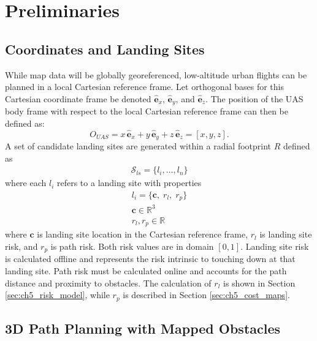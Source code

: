 \section{Preliminaries}\label{sec:ch5_preliminaries}

\subsection{Coordinates and Landing Sites}

While map data will be globally georeferenced, low-altitude urban flights can be planned in a local Cartesian reference frame.
Let orthogonal bases for this Cartesian coordinate frame be denoted $\hat{\mathbf{e}}_x$, $\hat{\mathbf{e}}_y$, and $\hat{\mathbf{e}}_z$. The position of the UAS body frame with respect to the local Cartesian reference frame can then be defined as:
\begin{equation}
\label{eq:position}
    {O}_{UAS}=x\,\hat{\mathbf{e}}_x+y\, \hat{\mathbf{e}}_y+z\, \hat{\mathbf{e}}_z = [x,y,z].
\end{equation}
A set of candidate landing sites are generated within a radial footprint $R$ defined as
\begin{align}
    \mathcal{S}_{ls} = \{ l_i, \ldots, l_n \}
\end{align}
where each $l_i$ refers to a landing site with properties
\begin{align}
    l_i = \{ \mathbf{c},\; r_{l}, \;r_{p} \} \\
    \mathbf{c} \in \mathbb{R}^3 \\
    r_{l}, r_{p} \in \mathbb{R}
\end{align}
where $\mathbf{c}$ is landing site location in the Cartesian reference frame, $r_{l}$ is landing site risk, and $r_{p}$ is path risk. Both risk values are in domain $[0,1]$. Landing site risk is calculated offline and represents the risk intrinsic to touching down at that landing site. Path risk must be calculated online and accounts for the path distance and proximity to obstacles. The calculation of $r_{l}$ is shown in Section \ref{sec:ch5_risk_model}, while $r_{p}$ is described in Section \ref{sec:ch5_cost_maps}.

\subsection{3D Path Planning with Mapped Obstacles}\label{sec:ch5_path_planning}

